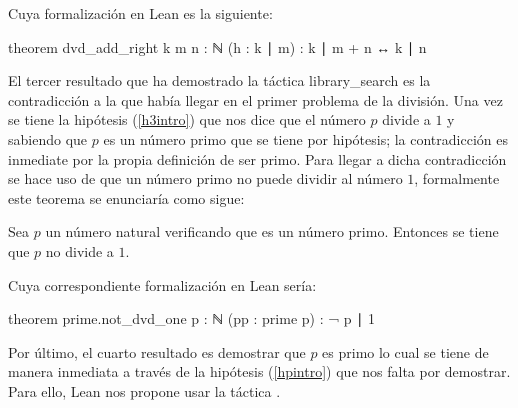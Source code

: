 Cuya formalización en Lean es la siguiente:
\begin{leancode}
theorem dvd_add_right {k m n : ℕ} (h : k ∣ m) : k ∣ m + n ↔ k ∣ n
\end{leancode}

El tercer resultado que ha demostrado la táctica
 {library\_search} es la contradicción a la que
había llegar en el primer problema de la división. Una vez se tiene la
hipótesis (\ref{h3intro}) que nos dice que el número \(p\) divide a
\(1\) y sabiendo que \(p\) es un número primo que se tiene por
hipótesis; la contradicción es inmediate por la propia definición de ser
primo. Para llegar a dicha contradicción se hace uso de que un número
primo no puede dividir al número \(1\), formalmente este teorema se
enunciaría como sigue:
\begin{teorema}
  Sea \(p\) un número natural verificando que es un número primo. Entonces
  se tiene que \(p\) no divide a \(1\).
\end{teorema}
Cuya correspondiente formalización en Lean sería:
\begin{leancode}
theorem prime.not_dvd_one {p : ℕ} (pp : prime p) : ¬ p ∣ 1
\end{leancode}

Por último, el cuarto resultado es demostrar que \(p\) es primo lo cual
se tiene de manera inmediata a través de la hipótesis (\ref{hpintro}) que nos
falta por demostrar.  Para ello, Lean nos propone usar la táctica
.

